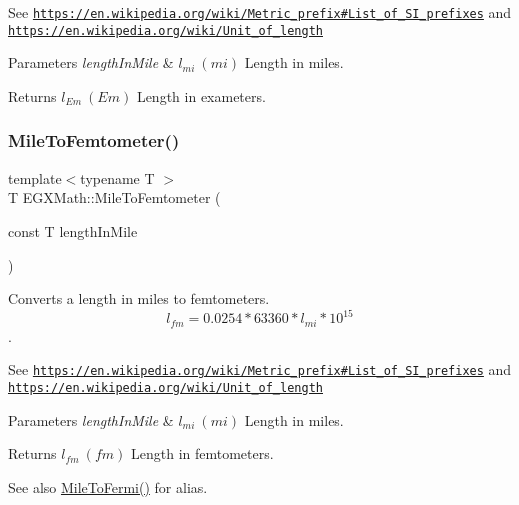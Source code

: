 See \href{https://en.wikipedia.org/wiki/Metric_prefix#List_of_SI_prefixes}{\tt https\+://en.\+wikipedia.\+org/wiki/\+Metric\+\_\+prefix\#\+List\+\_\+of\+\_\+\+S\+I\+\_\+prefixes} and \href{https://en.wikipedia.org/wiki/Unit_of_length}{\tt https\+://en.\+wikipedia.\+org/wiki/\+Unit\+\_\+of\+\_\+length} 
\begin{DoxyParams}{Parameters}
{\em length\+In\+Mile} & $ l_{mi}\ (mi)$ Length in miles. \\
\hline
\end{DoxyParams}
\begin{DoxyReturn}{Returns}
$ l_{Em}\ (Em)$ Length in exameters. 
\end{DoxyReturn}
\mbox{\label{group___e_g_x_math-_conversions-_length_conversions-_imperial-_mile-_s_i_ga760e3af0fd7e18bf8ece567008891e42}} 
\subsubsection{\texorpdfstring{Mile\+To\+Femtometer()}{MileToFemtometer()}}
{\footnotesize\ttfamily template$<$typename T $>$ \\
T E\+G\+X\+Math\+::\+Mile\+To\+Femtometer (\begin{DoxyParamCaption}\item[{const T}]{length\+In\+Mile }\end{DoxyParamCaption})}



Converts a length in miles to femtometers. \[ l_{fm}=0.0254 * 63360 * l_{mi} * 10^{15} \]. 

See \href{https://en.wikipedia.org/wiki/Metric_prefix#List_of_SI_prefixes}{\tt https\+://en.\+wikipedia.\+org/wiki/\+Metric\+\_\+prefix\#\+List\+\_\+of\+\_\+\+S\+I\+\_\+prefixes} and \href{https://en.wikipedia.org/wiki/Unit_of_length}{\tt https\+://en.\+wikipedia.\+org/wiki/\+Unit\+\_\+of\+\_\+length} 
\begin{DoxyParams}{Parameters}
{\em length\+In\+Mile} & $ l_{mi}\ (mi)$ Length in miles. \\
\hline
\end{DoxyParams}
\begin{DoxyReturn}{Returns}
$ l_{fm}\ (fm)$ Length in femtometers. 
\end{DoxyReturn}
\begin{DoxySeeAlso}{See also}
\mbox{\hyperlink{group___e_g_x_math-_conversions-_length_conversions-_imperial-_mile-_non-_s_i_gaf09d006cf827d210a8506e1add02cb0b}{Mile\+To\+Fermi()}} for alias. 
\end{DoxySeeAlso}
\mbox{\label{group___e_g_x_math-_conversions-_length_conversions-_imperial-_mile-_s_i_gac8c76e568a7a7f5c544b70808d85c61b}} 
